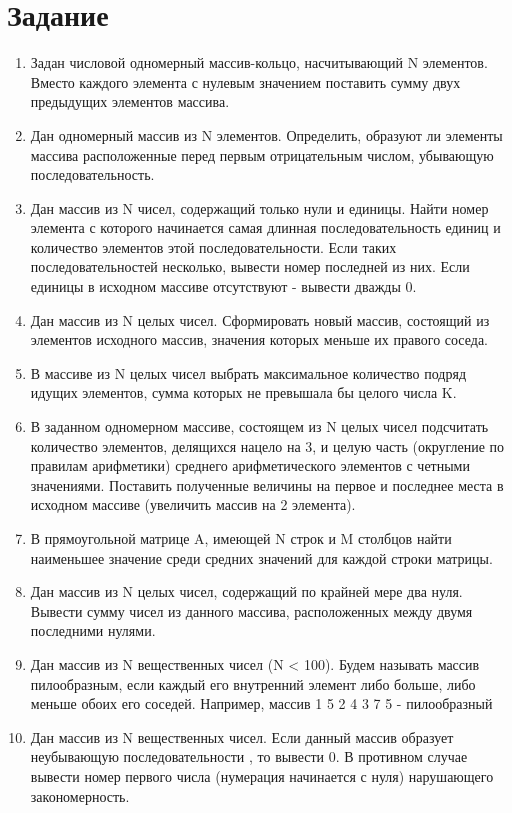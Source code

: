 \documentclass[a4paper,14pt]{extarticle}
\begin{document}
	\section*{Задание}
	\begin{enumerate}
		\item Задан числовой одномерный массив-кольцо, насчитывающий N элементов. Вместо каждого элемента с нулевым значением поставить сумму двух предыдущих элементов массива.
		
		\item Дан одномерный массив из N элементов. Определить, образуют ли элементы массива расположенные перед первым отрицательным числом, убывающую последовательность.
		
		\item Дан массив из N чисел, содержащий только нули и единицы. Найти номер элемента с которого начинается самая длинная последовательность единиц и количество элементов этой последовательности. Если таких последовательностей несколько, вывести номер последней из них. Если единицы в исходном массиве отсутствуют - вывести дважды 0.
		
		\item Дан массив из N целых чисел. Сформировать новый массив, состоящий из элементов исходного массив, значения которых меньше их правого соседа.
		
		\item В массиве из N целых чисел выбрать максимальное количество подряд идущих элементов, сумма которых не превышала бы целого числа K.
		
		\item В заданном одномерном массиве, состоящем из N целых чисел подсчитать количество элементов, делящихся нацело на 3, и целую часть (округление по правилам арифметики) среднего арифметического элементов с четными значениями. Поставить полученные величины на первое и последнее места в исходном массиве (увеличить массив на 2 элемента).
		
		\item В прямоугольной матрице A, имеющей N строк и M столбцов найти наименьшее значение среди средних значений для каждой строки матрицы.
		
		\item Дан массив из N целых чисел, содержащий по крайней мере два нуля. Вывести сумму чисел из данного массива, расположенных между двумя последними нулями.
		
		\item Дан массив из N вещественных чисел (N < 100). Будем называть массив пилообразным, если каждый его внутренний элемент либо больше, либо меньше обоих его соседей. Например, массив 1 5 2 4 3 7 5 - пилообразный
		
		\item Дан массив из N вещественных чисел. Если данный массив образует неубывающую последовательности , то вывести 0. В противном случае вывести номер первого числа (нумерация начинается с нуля) нарушающего закономерность.
	\end{enumerate}
	
\end{document}
